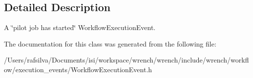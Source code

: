 \subsection{Detailed Description}
A \char`\"{}pilot job has started\char`\"{} Workflow\+Execution\+Event. 

The documentation for this class was generated from the following file\+:\begin{DoxyCompactItemize}
\item 
/\+Users/rafsilva/\+Documents/isi/workspace/wrench/wrench/include/wrench/workflow/execution\+\_\+events/Workflow\+Execution\+Event.\+h\end{DoxyCompactItemize}
